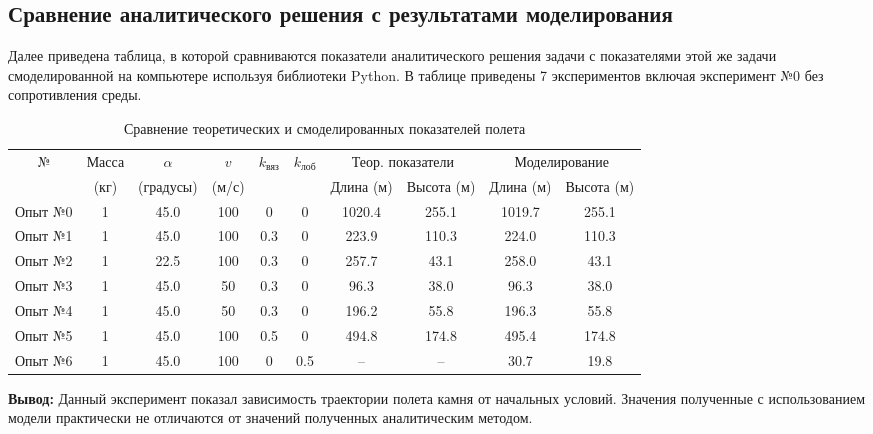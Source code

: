 \subsection*{Сравнение аналитического решения с результатами моделирования} 
Далее приведена таблица, в которой сравниваются показатели аналитического решения задачи с показателями этой же задачи смоделированной на компьютере используя библиотеки Python. В таблице приведены 7 экспериментов включая эксперимент №0 без сопротивления среды.
\newpage
\begin{table}[h]
\centering
\footnotesize
\caption{Сравнение теоретических и смоделированных показателей полета}
\begin{tabular}{|c|c|c|c|c|c|c|c|c|c|}
\hline
№ & Масса & $\alpha$ & $v$ & \multirow{2}{*}{$k_{\text{вяз}}$} & \multirow{2}{*}{$k_{\text{лоб}}$} & \multicolumn{2}{c|}{Теор. показатели} & \multicolumn{2}{c|}{Моделирование} \\
\cline{7-10}
   & (кг) & (градусы) & (м/с) & & & Длина (м) & Высота (м) & Длина (м) & Высота (м) \\
\hline
Опыт №0 & 1 & 45.0 & 100 & 0 & 0 & 1020.4 & 255.1 & 1019.7 & 255.1 \\
Опыт №1 & 1 & 45.0 & 100 & 0.3 & 0 & 223.9 & 110.3 & 224.0 & 110.3 \\
Опыт №2 & 1 & 22.5 & 100 & 0.3 & 0 & 257.7 & 43.1 & 258.0 & 43.1 \\
Опыт №3 & 1 & 45.0 & 50 & 0.3 & 0 & 96.3 & 38.0 & 96.3 & 38.0 \\
Опыт №4 & 1 & 45.0 & 50 & 0.3 & 0 & 196.2 & 55.8 & 196.3 & 55.8 \\
\hline
Опыт №5 & 1 & 45.0 & 100 & 0.5 & 0 & 494.8 & 174.8 & 495.4 & 174.8 \\
Опыт №6 & 1 & 45.0 & 100 & 0 & 0.5 & -- & -- & 30.7 & 19.8 \\
\hline
\end{tabular}
\end{table}
\noindent \textbf{Вывод:} Данный эксперимент показал зависимость траектории полета камня от начальных условий. Значения полученные с использованием модели практически не отличаются от значений полученных аналитическим методом.